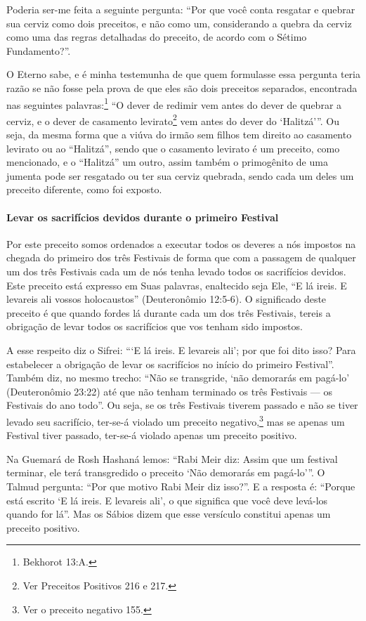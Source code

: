 Poderia ser-me feita a seguinte pergunta: ``Por que você conta resgatar
e quebrar sua cerviz como dois preceitos, e não como um, considerando a
quebra da cerviz como uma das regras detalhadas do preceito, de acordo
com o Sétimo Fundamento?''.

O Eterno sabe, e é minha testemunha de que quem formulasse essa pergunta
teria razão se não fosse pela prova de que eles são dois preceitos
separados, encontrada nas seguintes palavras:\footnote{Bekhorot 13:A.} ``O
dever de redimir vem antes do dever de quebrar a cerviz, e o dever de
casamento levirato\footnote{Ver Preceitos Positivos 216 e 217.} vem antes do dever do
`Halitzá'''. Ou seja, da mesma forma que a viúva
do irmão sem filhos tem direito ao casamento levirato ou ao ``Halitzá'',
sendo que o casamento levirato é um preceito, como mencionado, e o
``Halitzá'' um outro, assim também o primogênito de uma jumenta pode ser
resgatado ou ter sua cerviz quebrada, sendo cada um deles um preceito
diferente, como foi exposto.

\paragraph{Levar os sacrifícios devidos durante o primeiro Festival}

Por este preceito somos ordenados a executar todos os deveres a nós
impostos na chegada do primeiro dos três Festivais de forma que com a
passagem de qualquer um dos três Festivais cada um de nós tenha levado
todos os
sacrifícios devidos. Este preceito está expresso em Suas palavras,
enaltecido seja
Ele, ``E lá ireis. E levareis ali vossos holocaustos'' (Deuteronômio
12:5-6). O significado deste preceito é que quando fordes lá durante
cada um dos três Festivais, tereis a obrigação de levar todos os
sacrifícios que vos tenham sido impostos.

A esse respeito diz o Sifrei: ```E lá ireis. E levareis ali'; por que
foi dito isso? Para estabelecer a obrigação de levar os sacrifícios no
início do primeiro Festival''. Também diz, no mesmo trecho: ``Não se
transgride, `não demorarás em pagá-lo' (Deuteronômio 23:22) até que não
tenham terminado os três Festivais --- os Festivais do ano todo''. Ou seja, se os três
Festivais tiverem passado e não se tiver levado seu sacrifício, ter-se-á violado um
preceito negativo,\footnote{Ver o preceito negativo 155.} mas se apenas um Festival tiver passado,
ter-se-á violado apenas um preceito positivo.

Na Guemará de Rosh Hashaná lemos: ``Rabi Meir diz: Assim que um festival
terminar, ele terá transgredido o preceito `Não demorarás em pagá-lo'''.
O Talmud pergunta: ``Por que motivo Rabi Meir diz isso?''. E a resposta
é: ``Porque está escrito `E lá ireis. E levareis ali', o que significa
que você deve levá-los quando for lá''. Mas os Sábios dizem que esse
versículo constitui apenas um preceito positivo.

